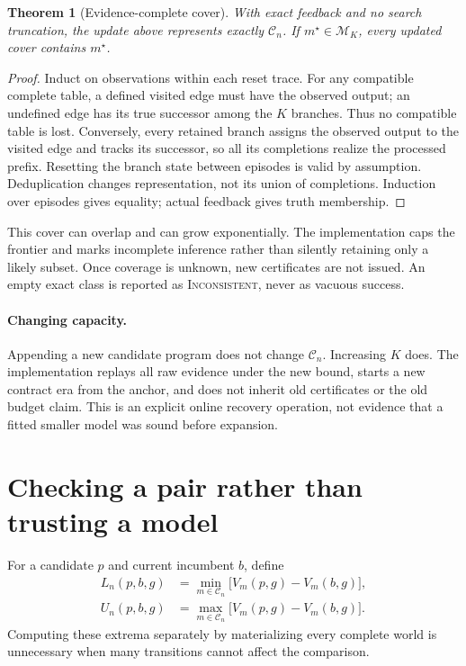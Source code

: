 \documentclass[10pt,twocolumn]{article}
\newtheorem{theorem}{Theorem}
\newcommand{\C}{\mathcal C}
\newcommand{\M}{\mathcal M}
\newcommand{\bad}{\textsc{Inconsistent}}
\begin{document}
\begin{theorem}[Evidence-complete cover]\label{thm:cover}
With exact feedback and no search truncation, the update above represents
exactly $\C_n$. If $m^\star\in\M_K$, every updated cover contains $m^\star$.
\end{theorem}
\begin{proof}
Induct on observations within each reset trace. For any compatible complete
table, a defined visited edge must have the observed output; an undefined edge
has its true successor among the $K$ branches. Thus no compatible table is lost.
Conversely, every retained branch assigns the observed output to the visited
edge and tracks its successor, so all its completions realize the processed
prefix. Resetting the branch state between episodes is valid by assumption.
Deduplication changes representation, not its union of completions. Induction
over episodes gives equality; actual feedback gives truth membership.
\end{proof}

This cover can overlap and can grow exponentially. The implementation caps the
frontier and marks incomplete inference rather than silently retaining only a
likely subset. Once coverage is unknown, new certificates are not issued.
An empty exact class is reported as \bad, never as vacuous success.

\paragraph{Changing capacity.}
Appending a new candidate program does not change $\C_n$. Increasing $K$ does.
The implementation replays all raw evidence under the new bound, starts a new
contract era from the anchor, and does not inherit old certificates or the old
budget claim. This is an explicit online recovery operation, not evidence that
a fitted smaller model was sound before expansion.

\section{Checking a pair rather than trusting a model}
For a candidate $p$ and current incumbent $b$, define
\begin{align}
 L_n(p,b,g)&=\min_{m\in\C_n}\big[V_m(p,g)-V_m(b,g)\big],\label{eq:lower}\\
 U_n(p,b,g)&=\max_{m\in\C_n}\big[V_m(p,g)-V_m(b,g)\big].\label{eq:upper}
\end{align}
Computing these extrema separately by materializing every complete world is
unnecessary when many transitions cannot affect the comparison.
\end{document}
